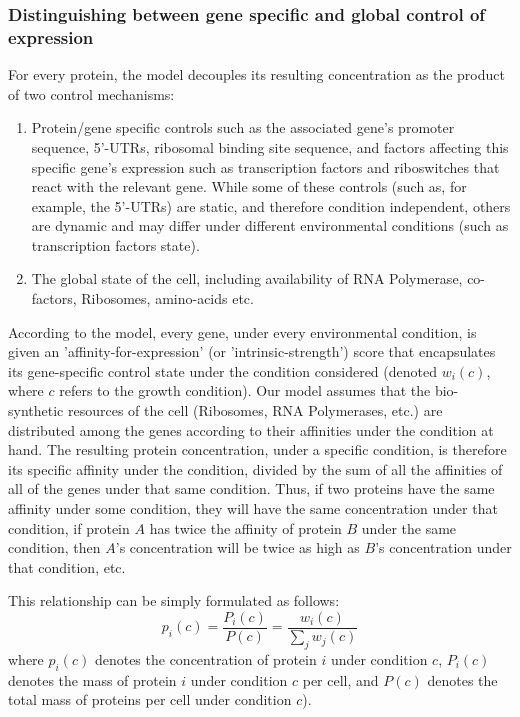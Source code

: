 \documentclass[notitlepage]{article}
\begin{document}
\subsubsection{Distinguishing between gene specific and global control of expression}
For every protein, the model decouples its resulting concentration as the product of two control mechanisms:
\begin{enumerate}
\item Protein/gene specific controls such as the associated gene's promoter sequence, 5'-UTRs, ribosomal binding site sequence, and factors affecting this specific gene's expression such as transcription factors and riboswitches that react with the relevant gene.
  While some of these controls (such as, for example, the 5'-UTRs) are static, and therefore condition independent, others are dynamic and may differ under different environmental conditions (such as transcription factors state).
\item The global state of the cell, including availability of RNA Polymerase, co-factors, Ribosomes, amino-acids etc.
\end{enumerate}
According to the model, every gene, under every environmental condition, is given an 'affinity-for-expression' (or 'intrinsic-strength') score that encapsulates its gene-specific control state under the condition considered (denoted $w_i(c)$, where $c$ refers to the growth condition).
Our model assumes that the bio-synthetic resources of the cell (Ribosomes, RNA Polymerases, etc.) are distributed among the genes according to their affinities under the condition at hand.
The resulting protein concentration, under a specific condition, is therefore its specific affinity under the condition, divided by the sum of all the affinities of all of the genes under that same condition.
Thus, if two proteins have the same affinity under some condition, they will have the same concentration under that condition, if protein $A$ has twice the affinity of protein $B$ under the same condition, then $A$'s concentration will be twice as high as $B$'s concentration under that condition, etc.

This relationship can be simply formulated as follows:
\begin{equation}
  \label{eq:concentration-ratio}
  p_i(c)=\frac{P_i(c)}{P(c)}=\frac{w_i(c)}{\sum_jw_j(c)}
\end{equation}
where $p_i(c)$ denotes the concentration of protein $i$ under condition $c$, $P_i(c)$ denotes the mass of protein $i$ under condition $c$ per cell, and $P(c)$ denotes the total mass of proteins per cell under condition $c$).
\end{document}
